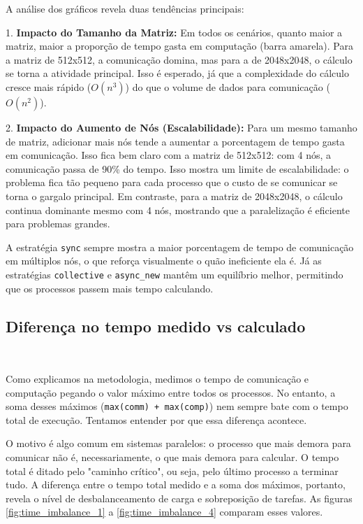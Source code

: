 \documentclass{article}
\begin{document}
A análise dos gráficos revela duas tendências principais:

1.  \textbf{Impacto do Tamanho da Matriz:} Em todos os cenários, quanto maior a matriz, maior a proporção de tempo gasta em computação (barra amarela). Para a matriz de 512x512, a comunicação domina, mas para a de 2048x2048, o cálculo se torna a atividade principal. Isso é esperado, já que a complexidade do cálculo cresce mais rápido ($O(n^3)$) do que o volume de dados para comunicação ($O(n^2)$).

2.  \textbf{Impacto do Aumento de Nós (Escalabilidade):} Para um mesmo tamanho de matriz, adicionar mais nós tende a aumentar a porcentagem de tempo gasta em comunicação. Isso fica bem claro com a matriz de 512x512: com 4 nós, a comunicação passa de 90\% do tempo. Isso mostra um limite de escalabilidade: o problema fica tão pequeno para cada processo que o custo de se comunicar se torna o gargalo principal. Em contraste, para a matriz de 2048x2048, o cálculo continua dominante mesmo com 4 nós, mostrando que a paralelização é eficiente para problemas grandes.

A estratégia \texttt{sync} sempre mostra a maior porcentagem de tempo de comunicação em múltiplos nós, o que reforça visualmente o quão ineficiente ela é. Já as estratégias \texttt{collective} e \texttt{async\_new} mantêm um equilíbrio melhor, permitindo que os processos passem mais tempo calculando.

\subsection{Diferença no tempo medido vs calculado}
\

Como explicamos na metodologia, medimos o tempo de comunicação e computação pegando o valor máximo entre todos os processos. No entanto, a soma desses máximos (\texttt{max(comm) + max(comp)}) nem sempre bate com o tempo total de execução. Tentamos entender por que essa diferença acontece.

O motivo é algo comum em sistemas paralelos: o processo que mais demora para comunicar não é, necessariamente, o que mais demora para calcular. O tempo total é ditado pelo "caminho crítico", ou seja, pelo último processo a terminar tudo. A diferença entre o tempo total medido e a soma dos máximos, portanto, revela o nível de desbalanceamento de carga e sobreposição de tarefas. As figuras \ref{fig:time_imbalance_1} a \ref{fig:time_imbalance_4} comparam esses valores.
\end{document}
